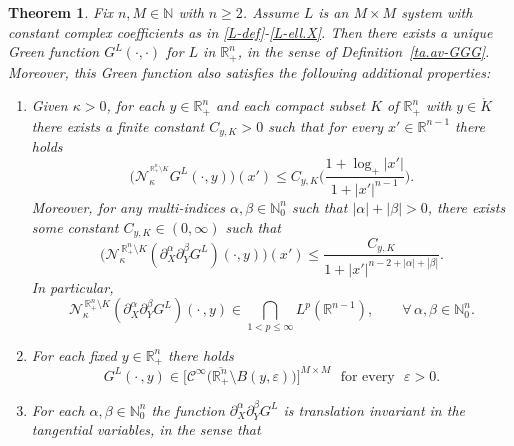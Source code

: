 \documentclass[11pt,reqno]{amsart}
\numberwithin{equation}{section}
\newtheorem{theorem}{Theorem}[section]
\theoremstyle{remark}
\begin{document}
\begin{theorem}\label{ta.av-GGG.2A}
Fix $n,M\in{\mathbb{N}}$ with $n\geq 2$. Assume $L$ is an $M\times M$ system with constant complex coefficients 
as in \eqref{L-def}-\eqref{L-ell.X}. Then there exists a unique Green function $G^L(\cdot,\cdot)$ for $L$ in 
$\mathbb{R}^n_{+}$, in the sense of Definition~\ref{ta.av-GGG}. Moreover, this Green function also satisfies 
the following additional properties:

\begin{enumerate}
%
\item[(1)] Given $\kappa>0$, for each $y\in{\mathbb{R}}^n_{+}$ and each compact subset 
$K$ of ${\mathbb{R}}^n_{+}$ with $y\in\mathring{K}$ there exists a finite constant $C_{y,K}>0$ 
such that for every $x'\in\mathbb{R}^{n-1}$ there holds
%
\begin{equation}\label{bound-NK-G}
\Big(\mathcal{N}^{^{\,{\mathbb{R}}^n_{+}\setminus K}}_\kappa G^L(\cdot,y)\Big)(x')
\leq C_{y,K}\Big(\frac{1+\log_{+}|x'|}{1+|x'|^{n-1}}\Big).
\end{equation}
%
Moreover, for any multi-indices $\alpha,\beta\in\mathbb{N}_0^n$ such that
$|\alpha|+|\beta|>0$, there exists some constant $C_{y,K}\in(0,\infty)$ such that
%
\begin{equation}\label{bouMNN}
\Big(\mathcal{N}^{\,{\mathbb{R}}^n_{+}\setminus K}_\kappa
(\partial^\alpha_X \partial^\beta_Y G^L)(\cdot,y)\Big)(x')\leq\frac{C_{y,K}}{1+|x'|^{n-2+|\alpha|+|\beta|}}.
\end{equation}
%
In particular,
%
\begin{equation}\label{GHCewd-22.RRe.4}
{\mathcal{N}}_\kappa^{\,{\mathbb{R}}^n_{+}\setminus K}(\partial_X^\alpha\partial_Y^\beta G^L)(\cdot\,,y)
\in\bigcap_{1<p\leq\infty}L^p({\mathbb{R}}^{n-1}),\qquad\forall\,\alpha,\beta\in{\mathbb{N}}_0^n.
\end{equation}
%
\item[(2)] For each fixed $y\in{\mathbb{R}}^n_{+}$ there holds
%
\begin{equation}\label{Fvabbb-7tF}
G^L(\cdot\,,y)\in\big[{\mathscr{C}}^\infty\big(\overline{{\mathbb{R}}^n_{+}}\setminus B(y,\varepsilon)\big)
\big]^{M\times M}\,\,\text{ for every }\,\,\varepsilon>0.
\end{equation}
%
\item[(3)] For each $\alpha,\beta\in\mathbb{N}_0^n$ the function 
$\partial^\alpha_X\partial^\beta_Y G^L$ is translation invariant 
in the tangential variables, in the sense that
%
\begin{equation}\label{JKBvc-ut4}

\end{equation}
\end{enumerate}
\end{theorem}
\end{document}
